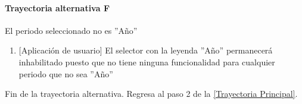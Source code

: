 \paragraph{Trayectoria alternativa F} \label{SUB-U-CU1.3:TF}
	El periodo seleccionado no es ''Año''
	\begin{enumerate}[label=F\arabic*.]
		\item {[Aplicación de usuario]} El selector con la leyenda ''Año'' permanecerá inhabilitado puesto que no tiene ninguna funcionalidad para cualquier periodo que no sea ''Año''
	\end{enumerate}
	Fin de la trayectoria alternativa. Regresa al paso 2 de la \hyperref[SUB-U-CU1.3:TP]{[Trayectoria Principal]}.